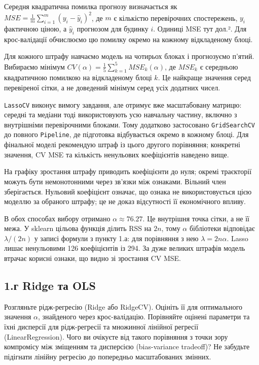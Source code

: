 \answerheading
Середня квадратична помилка прогнозу визначається як
\(MSE=\frac{1}{m}\sum_{i=1}^{m}(y_i-\widehat y_i)^2\), де \(m\) є
кількістю перевірочних спостережень, \(y_i\) фактичною ціною, а
\(\widehat y_i\) прогнозом для будинку \(i\). Одиниці MSE тут дол.². Для
крос-валідації обчислюємо цю помилку окремо на кожному відкладеному
блоці.

Для кожного штрафу навчаємо модель на чотирьох блоках і прогнозуємо
п'ятий. Вибираємо мінімум
\(CV(\alpha)=\frac15\sum_{k=1}^{5}MSE_k(\alpha)\), де \(MSE_k\) є
середньою квадратичною помилкою на відкладеному блоці \(k\). Це найкраще
значення серед перевіреної сітки, а не доведений мінімум серед усіх
додатних чисел.

\texttt{LassoCV} виконує вимогу завдання, але отримує вже масштабовану
матрицю: середні та медіани тоді використовують усю навчальну частину,
включно з внутрішніми перевірочними блоками. Тому додатково застосовано
\texttt{GridSearchCV} до повного \texttt{Pipeline}, де підготовка
відбувається окремо в кожному блоці. Для фінальної моделі рекомендую
штраф із цього другого порівняння; конкретні значення, CV MSE та
кількість ненульових коефіцієнтів наведено вище.

На графіку зростання штрафу приводить коефіцієнти до нуля; окремі
траєкторії можуть бути немонотонними через зв'язки між ознаками. Вільний
член зберігається. Нульовий коефіцієнт означає, що ознака не
використовується цією моделлю за обраного штрафу; це не доказ
відсутності її економічного впливу.

В обох способах вибору отримано \(\alpha \approx 76.27\). Це внутрішня
точка сітки, а не її межа. У sklearn цільова функція ділить RSS на
\(2n\), тому \(\alpha\) бібліотеки відповідає \(\lambda/(2n)\) у записі
формули з пункту 1.а: для порівняння з нею \(\lambda=2n\alpha\). Lasso
лишає ненульовими 126 коефіцієнтів із 294. За дуже великих штрафів
модель втрачає корисні ознаки, що видно зі зростання CV MSE.


\Needspace{248pt}

\subsection{1.г Ridge та OLS}

\begin{taskstatement}Розгляньте рідж-регресію (Ridge або RidgeCV). Оцініть її для
оптимального значення \(\alpha\), знайденого через крос-валідацію.
Порівняйте оцінені параметри та їхні дисперсії для рідж-регресії та
множинної лінійної регресії (LinearRegression). Чого ви очікуєте від
такого порівняння з точки зору компромісу між зміщенням та дисперсією
(bias-variance tradeoff)? Не забудьте підігнати лінійну регресію до
попередньо масштабованих змінних.
\end{taskstatement}

